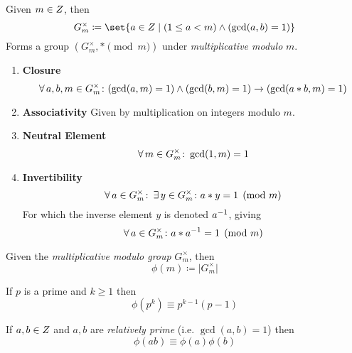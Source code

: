 \begin{definition}
    Given $m \in \relax{Z}$, then
    \begin{equation}
        G^{\times}_{m} \coloneqq \set{a \in \Int \mid (1 \le a < m) \land (\gcd(a, b) = 1)}
    \end{equation}
    Forms a group $\left( G^{\times}_{m}, \ast \pmod{m} \right)$ under \textit{multiplicative modulo} $m$.
    
    \begin{enumerate}
        \item \textbf{Closure}
        \begin{equation}
            \operatorname{\forall} a, b, m \in G^{\times}_{m} \colon 
                (\gcd(a, m) = 1) \land (\gcd(b, m) = 1) \to (\gcd(a \ast b, m) = 1)
        \end{equation}
        \item \textbf{Associativity}
            \subitem Given by multiplication on integers modulo $m$.
        \item \textbf{Neutral Element}
        \begin{equation}
            \operatorname{\forall} m \in G^{\times}_{m} \colon \gcd(1, m) = 1
        \end{equation}
        \item \textbf{Invertibility}
        \begin{equation}
            \operatorname{\forall} a \in G^{\times}_{m} \colon \operatorname{\exists} y \in G^{\times}_{m} \colon a \ast y = 1 \pmod{m}
        \end{equation}
        For which the inverse element $y$ is denoted ${a}^{-1}$, giving
        \begin{equation}
            \operatorname{\forall} a \in G^{\times}_{m} \colon a \ast {a}^{-1} = 1 \pmod{m}
        \end{equation}
    \end{enumerate}
\end{definition}

\begin{theorem}
    Given the \textit{multiplicative modulo group} $G^{\times}_{m}$, then
    \begin{equation}
        \phi(m) \coloneqq \lvert G^{\times}_{m} \rvert
    \end{equation}
\end{theorem}

\begin{theorem}
    If $p$ is a prime and $k \ge 1$ then
    \begin{equation}
        \phi(p^k) \equiv p^{k - 1}(p - 1)
    \end{equation}
\end{theorem}

\begin{theorem}
    If $a, b \in \relax{Z}$ and $a, b$ are \textit{relatively prime} (i.e. $\gcd(a, b) = 1$) then
    \begin{equation}
        \phi(ab) \equiv \phi(a) \phi(b)
    \end{equation}
\end{theorem}

